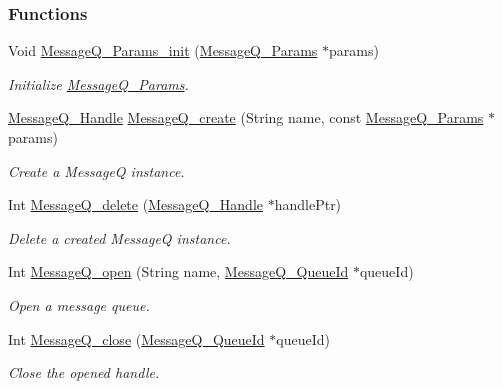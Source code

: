 \subsubsection*{Functions}
\begin{DoxyCompactItemize}
\item 
Void \hyperlink{_message_q_8h_a896b64c7afc22be66f1a6c3aa157537f}{Message\-Q\-\_\-\-Params\-\_\-init} (\hyperlink{struct_message_q___params}{Message\-Q\-\_\-\-Params} $\ast$params)
\begin{DoxyCompactList}\small\item\em Initialize \hyperlink{struct_message_q___params}{Message\-Q\-\_\-\-Params}. \end{DoxyCompactList}\item 
\hyperlink{_message_q_8h_a1d584ce08733ca864d81e1e64a41cf7a}{Message\-Q\-\_\-\-Handle} \hyperlink{_message_q_8h_a1f2be1c6bf60aa6e220cf5805052f727}{Message\-Q\-\_\-create} (String name, const \hyperlink{struct_message_q___params}{Message\-Q\-\_\-\-Params} $\ast$params)
\begin{DoxyCompactList}\small\item\em Create a Message\-Q instance. \end{DoxyCompactList}\item 
Int \hyperlink{_message_q_8h_a10986c1a6b64d3ca07c38d1521ea16cd}{Message\-Q\-\_\-delete} (\hyperlink{_message_q_8h_a1d584ce08733ca864d81e1e64a41cf7a}{Message\-Q\-\_\-\-Handle} $\ast$handle\-Ptr)
\begin{DoxyCompactList}\small\item\em Delete a created Message\-Q instance. \end{DoxyCompactList}\item 
Int \hyperlink{_message_q_8h_af9e6bd0c1dbb236eb4a618211bf15325}{Message\-Q\-\_\-open} (String name, \hyperlink{_message_q_8h_a34dd32b58cf0476c2d90e3f702843297}{Message\-Q\-\_\-\-Queue\-Id} $\ast$queue\-Id)
\begin{DoxyCompactList}\small\item\em Open a message queue. \end{DoxyCompactList}\item 
Int \hyperlink{_message_q_8h_ab2cdb25f8e9fec3fe3f17a43c0b85bed}{Message\-Q\-\_\-close} (\hyperlink{_message_q_8h_a34dd32b58cf0476c2d90e3f702843297}{Message\-Q\-\_\-\-Queue\-Id} $\ast$queue\-Id)
\begin{DoxyCompactList}\small\item\em Close the opened handle. \end{DoxyCompactList}\item 

\end{DoxyCompactItemize}

